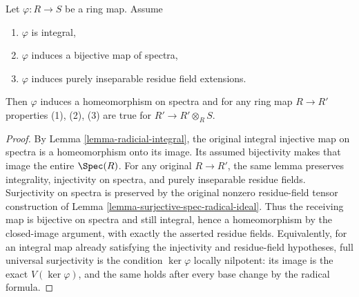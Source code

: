 \begin{lemma}
\label{lemma-radicial-integral-bijective}
Let $\varphi : R \to S$ be a ring map. Assume
\begin{enumerate}
\item $\varphi$ is integral,
\item $\varphi$ induces a bijective map of spectra,
\item $\varphi$ induces purely inseparable residue field extensions.
\end{enumerate}
Then $\varphi$ induces a homeomorphism on spectra and for any ring map
$R \to R'$ properties (1), (2), (3) are true for $R' \to R' \otimes_R S$.
\end{lemma}

\begin{proof}
By Lemma \ref{lemma-radicial-integral}, the
original integral injective map on spectra
is a homeomorphism onto its image.
Its assumed bijectivity makes that image
the entire $\Spec(R)$. For any original
$R\to R'$, the same lemma preserves
integrality, injectivity on spectra,
and purely inseparable residue fields.
Surjectivity on spectra is preserved
by the original nonzero residue-field
tensor construction of Lemma
\ref{lemma-surjective-spec-radical-ideal}.
Thus the receiving map is bijective
on spectra and still integral, hence
a homeomorphism by the closed-image
argument, with exactly the asserted
residue fields. Equivalently, for
an integral map already satisfying
the injectivity and residue-field
hypotheses, full universal surjectivity
is the condition $\ker\varphi$
locally nilpotent: its image is
the exact $V(\ker\varphi)$, and
the same holds after every base
change by the radical formula.
\end{proof}